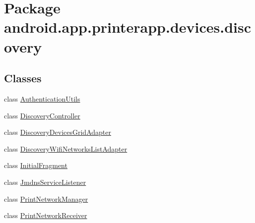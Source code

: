 \hypertarget{namespaceandroid_1_1app_1_1printerapp_1_1devices_1_1discovery}{}\section{Package android.\+app.\+printerapp.\+devices.\+discovery}
\label{namespaceandroid_1_1app_1_1printerapp_1_1devices_1_1discovery}
\subsection*{Classes}
\begin{DoxyCompactItemize}
\item 
class \hyperlink{classandroid_1_1app_1_1printerapp_1_1devices_1_1discovery_1_1_authentication_utils}{Authentication\+Utils}
\item 
class \hyperlink{classandroid_1_1app_1_1printerapp_1_1devices_1_1discovery_1_1_discovery_controller}{Discovery\+Controller}
\item 
class \hyperlink{classandroid_1_1app_1_1printerapp_1_1devices_1_1discovery_1_1_discovery_devices_grid_adapter}{Discovery\+Devices\+Grid\+Adapter}
\item 
class \hyperlink{classandroid_1_1app_1_1printerapp_1_1devices_1_1discovery_1_1_discovery_wifi_networks_list_adapter}{Discovery\+Wifi\+Networks\+List\+Adapter}
\item 
class \hyperlink{classandroid_1_1app_1_1printerapp_1_1devices_1_1discovery_1_1_initial_fragment}{Initial\+Fragment}
\item 
class \hyperlink{classandroid_1_1app_1_1printerapp_1_1devices_1_1discovery_1_1_jmdns_service_listener}{Jmdns\+Service\+Listener}
\item 
class \hyperlink{classandroid_1_1app_1_1printerapp_1_1devices_1_1discovery_1_1_print_network_manager}{Print\+Network\+Manager}
\item 
class \hyperlink{classandroid_1_1app_1_1printerapp_1_1devices_1_1discovery_1_1_print_network_receiver}{Print\+Network\+Receiver}
\end{DoxyCompactItemize}
